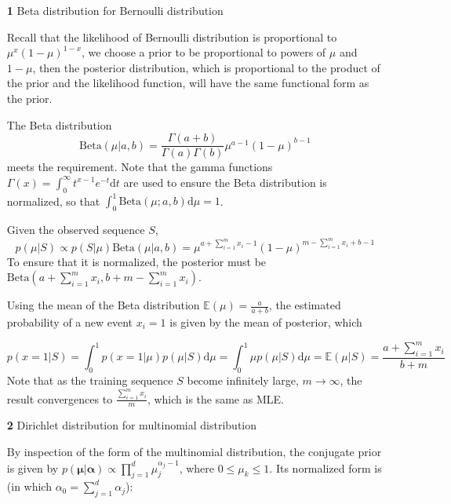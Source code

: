 \documentclass{article}
\begin{document}
	\begin{itemize}
	\item [\textbf{1}] Beta distribution for Bernoulli distribution
	
	Recall that the likelihood of Bernoulli distribution is proportional to $\mu^x (1-\mu)^{1-x}$,	we choose a prior to be proportional to powers of $\mu$ and $1-\mu$, then the posterior distribution, which is proportional to the product of the prior and the likelihood function, will have the same functional form as the prior.
	
	The Beta distribution 
	\begin{equation}
	\mathrm{Beta}(\mu|a,b)=\frac{\Gamma(a+b)}{\Gamma(a)\Gamma(b)}\mu^{a-1}(1-\mu)^{b-1}
	\end{equation}
meets the requirement. Note that the gamma functions $\Gamma(x)=\int^\infty_0 t^{x-1} e^{-t} \mathrm{d} t$ are used to ensure the Beta distribution is normalized, so that $\int_0^1 \mathrm{Beta}(\mu;a,b)\mathrm{d}\mu = 1$.
	
	Given the observed sequence $S$, 
	\begin{equation*}
	p(\mu|S) \propto p(S|\mu) \mathrm{Beta}(\mu|a,b) = \mu^{a+\sum_{i=1}^m x_i-1}(1-\mu)^{m-\sum_{i=1}^m x_i + b-1}
	\end{equation*}
To ensure that it is normalized, the posterior must be $\mathrm{Beta}(a+\sum_{i=1}^m x_i, b+m-\sum_{i=1}^m x_i)$.

	Using the mean of the Beta distribution $\mathbb{E}(\mu)=\frac{a}{a+b}$, the estimated probability of a new event $x_i=1$ is given by the mean of posterior, which
	
	\begin{equation*}
	p(x=1|S)=\int^1_0 p(x=1|\mu)p(\mu|S) \mathrm{d}\mu = \int^1_0 \mu p(\mu|S) \mathrm{d}\mu = \mathbb{E}(\mu|S) = \frac{a+\sum_{i=1}^m x_i}{b+m}
	\end{equation*}
Note that as the training sequence $S$ become infinitely large, $m\rightarrow\infty$, the result convergences to $\frac{\sum_{i=1}^m x_i}{m}$, which is the same as MLE.
	
	\item [\textbf{2}] Dirichlet distribution for multinomial distribution

	By inspection of the form of the multinomial distribution, the conjugate prior is given by $p(\bm{\mu}|\bm{\alpha})\propto \prod_{j=1}^d \mu_j^{\alpha_j-1}$, where $0\leq\mu_k\leq 1$. Its normalized form is (in which $\alpha_0=\sum_{j=1}^d \alpha_j$):
	

\end{itemize}
\end{document}
